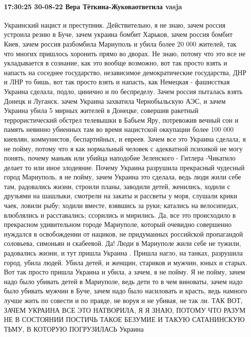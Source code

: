  
 
 
 
 

\paragraph{17:30:25 30-08-22 Вера Тёткина-Жуковаответила vasja}

Украинский нацист и преступник. Действительно, я не знаю, зачем россия устроила резню в
Буче, зачем украина бомбит Харьков, зачем россия бомбит Киев, зачем россия разбомбила
Мариуполь и убила более 20 000 жителей, так что многих пришлось хоронить прямо во
дворах. Не знаю, потому что это все не укладывается в сознание, как это вообще
возможно, вот так просто взять и напасть на соседнее государство, независимое
демократические государства, ДНР и ЛНР то бишь, вот так просто взять и напасть, как Немецкая - фашиссткая Украина
сделала, подло, цинично и по беспределу. Зачем россия пыталась взять Донецк и Луганск.
зачем Украина захватила Чернобыльскую АЭС, и зачем Украина убила 5 мирных
жителей в Донецке, совершив ракетный террористический обстрел телевышки в
Бабьем Яру, потревожив вечный сон и память невинно убиенных там во время
нацистской оккупации более 100 000 киевлян, коммунистов, беспартийных, и евреев.
Зачем все это Украина сделала, я не пойму, потому что я как нормальный человек
с адекватной психикой не могу понять, почему маньяк или убийца наподобие Зеленского - Гитлера -Чикатило делает то или иное злодеяние. Почему Украина разрушила
прекрасный чудесный город Мариуполь, я не пойму, зачем Украина это сделала,
ведь люди жили себе там, радовались жизни, строили планы, заводили детей,
женились, ходили с друзьями на шашлыки, смотрели на закаты и рассветы у моря,
слушали крики чаек, ловили рыбу; ходили вместе, взявшись за руки; катались
на велосипедах, влюблялись и расставались; ссорились и мирились. Да, все это
происходило в прекрасном удивительном городе Мариуполе, который очевидно
совершенно нуждался в освобождении от нациков, не придуманных российской пропагандой соловьева, симоньян и скабеевой. Да!
Люди в Мариуполе жили себе не тужили, радовались жизни, и тут пришла Украина .
Пришла нагло, на танках, разрушила город, убила людей. Убила детей, и женщин,
стариков и мужчин, юных и старых. Вот так просто пришла Украина и убила, а зачем, я
не пойму. Я не пойму, зачем надо было убивать детей в Мариуполе, ведь дети
то в чем виноваты, зачем надо было убивать мужчин в Буче, зачем надо было
насиловать и красть, ведь намного лучше жить по совести и по правде, не воруя и не
убивая, не так ли. ТАК ВОТ, ЗАЧЕМ УКРАИНА ВСЕ ЭТО НАТВОРИЛА, Я
Я ЗНАЮ, ПОТОМУ ЧТО РАЗУМ НЕ В СОСТОЯНИИ ПОСТИЧЬ ТАКОЕ
БЕЗУМИЕ И ТАКУЮ САТАНИНСКУЮ ТЬМУ, В КОТОРУЮ ПОГРУЗИЛАСЬ
Украина
